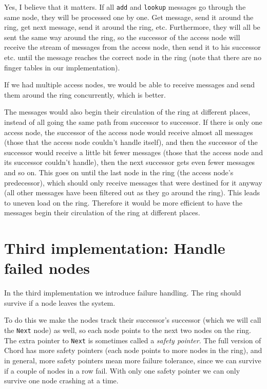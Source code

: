 \documentclass[a4paper, 11pt]{article}
\begin{document}
Yes, I believe that it matters. If all \texttt{add} and \texttt{lookup} messages go through the same node, they will be processed one by one. Get message, send it around the ring, get next message, send it around the ring, etc. Furthermore, they will all be sent the same way around the ring, so the successor of the access node will receive the stream of messages from the access node, then send it to his successor etc. until the message reaches the correct node in the ring (note that there are no finger tables in our implementation).

If we had multiple access nodes, we would be able to receive messages and send them around the ring concurrently, which is better. 

The messages would also begin their circulation of the ring at different places, instead of all going the same path from successor to successor. If there is only one access node, the successor of the access node would receive almost all messages (those that the access node couldn't handle itself), and then the successor of the successor would receive a little bit fewer messages (those that the access node and its successor couldn't handle), then the next successor gets even fewer messages and so on. This goes on until the last node in the ring (the access node's predecessor), which should only receive messages that were destined for it anyway (all other messages have been filtered out as they go around the ring). This leads to uneven load on the ring. Therefore it would be more efficient to have the messages begin their circulation of the ring at different places.

\section{Third implementation: Handle failed nodes}

In the third implementation we introduce failure handling. The ring should survive if a node leaves the system.

To do this we make the nodes track their successor's successor (which we will call the \texttt{Next} node) as well, so each node points to the next two nodes on the ring. The extra pointer to \texttt{Next} is sometimes called a \textit{safety pointer}. The full version of Chord has more safety pointers (each node points to more nodes in the ring), and in general, more safety pointers mean more failure tolerance, since we can survive if a couple of nodes in a row fail. With only one safety pointer we can only survive one node crashing at a time.
\end{document}
